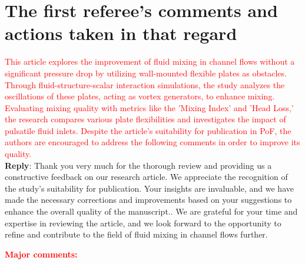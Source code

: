 \documentclass[onecolumn,a4paper,amsmath,amssym,pre]{revtex4}
\begin{document}
				\newpage
				
				
				\section*{\textbf{The first referee's comments and actions taken in that regard}}   
				
				\textcolor{red}{This article explores the improvement of fluid mixing in channel flows without a significant pressure drop by utilizing wall-mounted flexible plates as obstacles. Through fluid-structure-scalar interaction simulations, the study analyzes the oscillations of these plates, acting as vortex generators, to	enhance mixing. Evaluating mixing quality with metrics like the ’Mixing Index’ and ’Head Loss,’ the research compares various plate flexibilities and investigates the impact of pulsatile fluid inlets. Despite the article’s suitability for publication in PoF, the authors are encouraged to address the following comments in order to improve its quality.}\\
				
				\textbf{Reply}: Thank you very much for the thorough review and providing us a constructive feedback on our research article. We appreciate the recognition of the study's suitability for publication.  Your insights are invaluable, and we have made the necessary corrections and improvements based on your suggestions to enhance the overall quality of the manuscript.. We are grateful for your time and expertise in reviewing the article, and we look forward to the opportunity to refine and contribute to the field of fluid mixing in channel flows further.\\
				\par\null\par
				\textcolor{red}{\textbf{Major comments:}}
				
\end{document}
